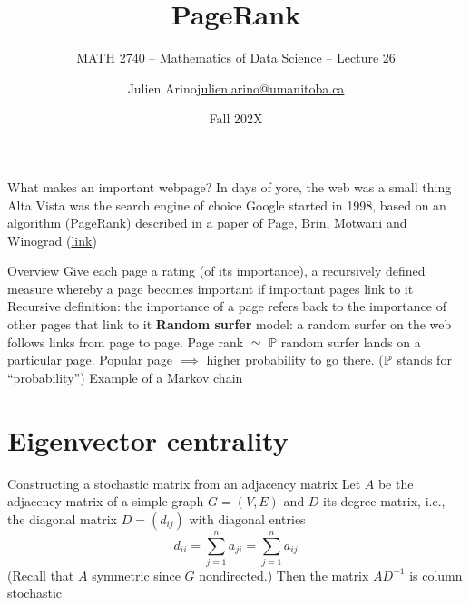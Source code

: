 \documentclass[aspectratio=169]{beamer}\usepackage[]{graphicx}\usepackage[]{xcolor}
\subtitle{MATH 2740 -- Mathematics of Data Science -- Lecture 26}
\author{\texorpdfstring{Julien Arino\newline\url{julien.arino@umanitoba.ca}}{Julien Arino}}
\institute{Department of Mathematics @ University of Manitoba}
\date{Fall 202X}
\title{PageRank}
\begin{document}


\begin{frame}{What makes an important webpage?}
	In days of yore, the web was a small thing
	\vfill
	Alta Vista was the search engine of choice
	\vfill
	Google started in 1998, based on an algorithm (PageRank) described in a paper of Page, Brin, Motwani and Winograd (\href{https://storm.cis.fordham.edu/~gweiss/selected-papers/classic-pagerank-paper.pdf}{link})
\end{frame}

\begin{frame}{Overview}
	Give each page a rating (of its importance), a recursively defined measure whereby a page becomes important if important pages link to it
	\vfill
	Recursive definition: the importance of a page refers back to the importance of other pages that link to it
	\vfill
	\textbf{Random surfer} model: a random surfer on the web follows links from page to page. Page rank $\simeq$ $\mathbb{P}$ random surfer lands on a particular page. Popular page $\implies$ higher probability to go there.  
	($\mathbb{P}$ stands for ``probability'')
	\vfill Example of a Markov chain
\end{frame}

\section{Eigenvector centrality}

\begin{frame}{Constructing a stochastic matrix from an adjacency matrix}
	Let $A$ be the adjacency matrix of a simple graph $G=(V,E)$ and $D$ its degree matrix, i.e., the diagonal matrix $D=(d_{ij})$ with diagonal entries
	\[
		d_{ii} = \sum_{j=1}^n a_{ji} =\sum_{j=1}^n a_{ij}
	\]
	(Recall that $A$ symmetric since $G$ nondirected.)
	Then the matrix $AD^{-1}$ is column stochastic
\end{frame}
\end{document}
